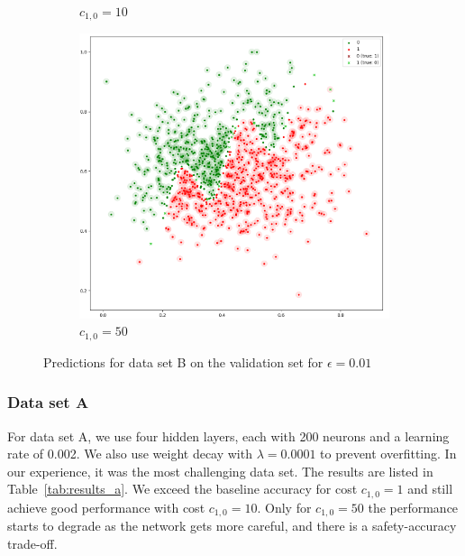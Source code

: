 \documentclass[acmsmall,nonacm]{acmart}
\begin{document}
\begin{figure}[H]
\begin{subfigure}[b]{0.32\textwidth}
      \caption{$c_{1, 0} = 10$}
    \end{subfigure}
    \begin{subfigure}[b]{0.32\textwidth}
      \includegraphics[width=\textwidth]{assets/b-val-cost50-eps0_01}
      \caption{$c_{1, 0} = 50$}
    \end{subfigure}
    \caption{Predictions for data set B on the validation set for $\epsilon = 0.01$}
    \label{fig:b_val_results}
  \end{figure}

\subsubsection*{Data set A}
For data set A, we use four hidden layers, each with 200 neurons and a learning rate of 0.002. We also use weight decay with $\lambda=0.0001$ to prevent overfitting. In our experience, it was the most challenging data set. The results are listed in Table~\ref{tab:results_a}. We exceed the baseline accuracy for cost $c_{1, 0} = 1$ and still achieve good performance with cost $c_{1, 0} = 10$. Only for $c_{1, 0} = 50$ the performance starts to degrade as the network gets more careful, and there is a safety-accuracy trade-off. 
\end{document}
